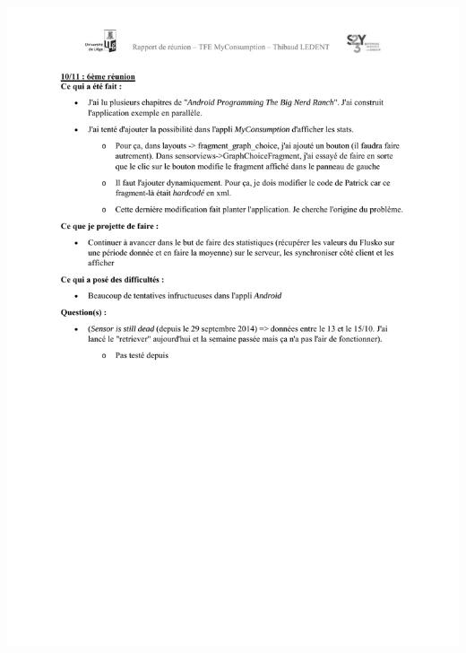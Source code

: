 \documentclass[a4paper, oneside, 11pt]{book}
\begin{document}
\includegraphics[width=1\textwidth]{reports_NB_Part6.pdf}
\newpage
\end{document}
